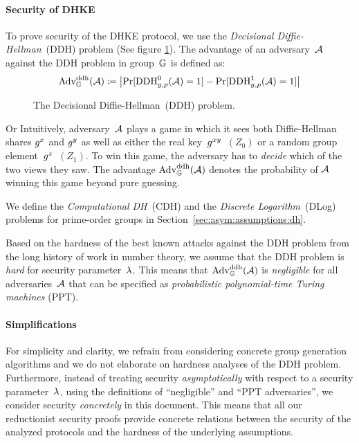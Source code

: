 \paragraph{Security of DHKE}
To prove security of the DHKE protocol, we use the \emph{Decisional Diffie-Hellman}~(DDH) problem (See figure \ref{fig:ddh_assumption}).
The advantage of an adversary~$\mathcal{A}$ against the DDH problem in group~$\mathbb{G}$ is defined as:
\[\mathrm{Adv}_{\mathbb{G}}^{\mathrm{ddh}}(\mathcal{A})\coloneqq\left|\Pr[\text{DDH}^0_{g,p}(\mathcal{A})=1]-\Pr[\text{DDH}^1_{g,p}(\mathcal{A})=1]\right|\]
\begin{figure}[t]
    \centering
    
    \caption{The Decisional Diffie-Hellman~(DDH) problem.}
    \label{fig:ddh_assumption}
\end{figure}
Or 
Intuitively, adversary~$\mathcal{A}$ plays a game in which it sees both Diffie-Hellman shares $g^x$ and $g^y$ as well as either the real key~$g^{xy}$~$(Z_0)$ or a random group element~$g^z$~$(Z_1)$.
To win this game, the adversary has to \emph{decide} which of the two views they saw.
The advantage $\mathrm{Adv}_{\mathbb{G}}^{\mathrm{ddh}}(\mathcal{A})$ denotes the probability of $\mathcal{A}$ winning this game beyond pure guessing.

We define the \emph{Computational DH}~(CDH) and the \emph{Discrete Logarithm}~(DLog) problems for prime-order groups in Section~\ref{sec:asym:assumptions:dh}.

Based on the hardness of the best known attacks against the DDH problem from the long history of work in number theory, we assume that the DDH problem is \emph{hard} for security parameter~$\lambda$.
This means that $\mathrm{Adv}_{\mathbb{G}}^{\mathrm{ddh}}(\mathcal{A})$ is \emph{negligible} for all adversaries~$\mathcal{A}$ that can be specified as \emph{probabilistic polynomial-time Turing machines} (PPT).

\paragraph{Simplifications}
For simplicity and clarity, we refrain from considering concrete group generation algorithms and we do not elaborate on hardness analyses of the DDH problem.
Furthermore, instead of treating security \emph{asymptotically} with respect to a security parameter~$\lambda$, using the definitions of ``negligible'' and ``PPT adversaries'', we consider security \emph{concretely} in this document.
This means that all our reductionist security proofs provide concrete relations between the security of the analyzed protocols and the hardness of the underlying assumptions.


